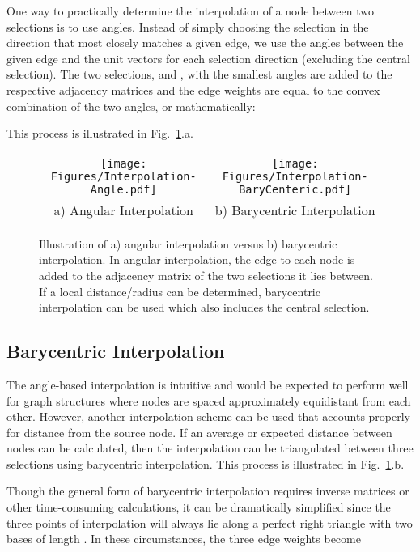 \documentclass[10pt,twocolumn,letterpaper]{article}
\begin{document}
One way to practically determine the interpolation of a node between two selections is to use angles. Instead of simply choosing the selection in the direction that most closely matches a given edge, we use the angles between the given edge and the unit vectors for each selection direction (excluding the central selection). The two selections,  and , with the smallest angles are added to the respective adjacency matrices and the edge weights are equal to the convex combination of the two angles, or mathematically:


\noindent This process is illustrated in Fig.~\ref{fig:interpolation}.a.

\begin{figure}
\begin{center}
\begin{tabular}{cc}
\texttt{[image: Figures/Interpolation-Angle.pdf]}
& \texttt{[image: Figures/Interpolation-BaryCenteric.pdf]}
\\ a) Angular Interpolation &
b) Barycentric Interpolation
\end{tabular}
\end{center}
   \caption{Illustration of a) angular interpolation versus b) barycentric interpolation. In angular interpolation, the edge to each node is added to the adjacency matrix of the two selections it lies between. If a local distance/radius can be determined, barycentric interpolation can be used which also includes the central selection. 
   }
\label{fig:interpolation}
\end{figure}





\subsection{Barycentric Interpolation}

The angle-based interpolation is intuitive and would be expected to perform well for graph structures where nodes are spaced approximately equidistant from each other. However, another interpolation scheme can be used that accounts properly for distance from the source node. If an average or expected distance between nodes can be calculated, then the interpolation can be triangulated between three selections using barycentric interpolation. This process is illustrated in Fig.~\ref{fig:interpolation}.b.

Though the general form of barycentric interpolation requires inverse matrices or other time-consuming calculations, it can be dramatically simplified since the three points of interpolation will always lie along a perfect right triangle with two bases of length . In these circumstances, the three edge weights become
\end{document}
